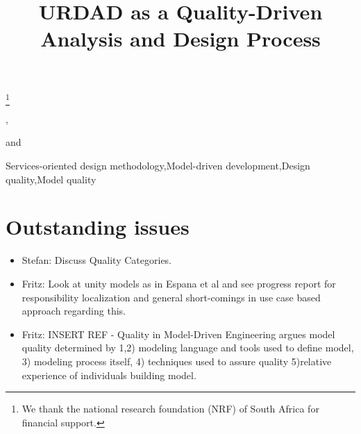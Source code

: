 \documentclass{IOS-Book-Article}
\begin{document}
\begin{frontmatter} 

\title{URDAD as a Quality-Driven Analysis and Design Process}
\thanks{We thank the national research foundation (NRF) of South Africa for financial support.}

\author[A]{ }
,
\author[A]{ }
and
\author[A]{ }

\address[A]{Department of Computer Science, University of Pretoria, South Africa}


\begin{keyword}
Services-oriented design methodology\sep Model-driven development\sep Design quality\sep Model quality
\end{keyword}
\end{frontmatter}

\thispagestyle{empty}
\pagestyle{empty}

\maketitle

\section{Outstanding issues}
\begin{itemize}
 \item Stefan: Discuss Quality Categories. 
 \item Fritz: Look at unity models as in Espana et al and see progress report for responsibility localization and general short-comings in use case based approach regarding this. 
 \item Fritz: INSERT REF - Quality in Model-Driven Engineering argues model quality determined by 1,2) modeling language and tools used to define model, 3) modeling process itself, 4) techniques used to assure quality 5)relative experience of individuals building model. 
\end{itemize}
















\end{document}
